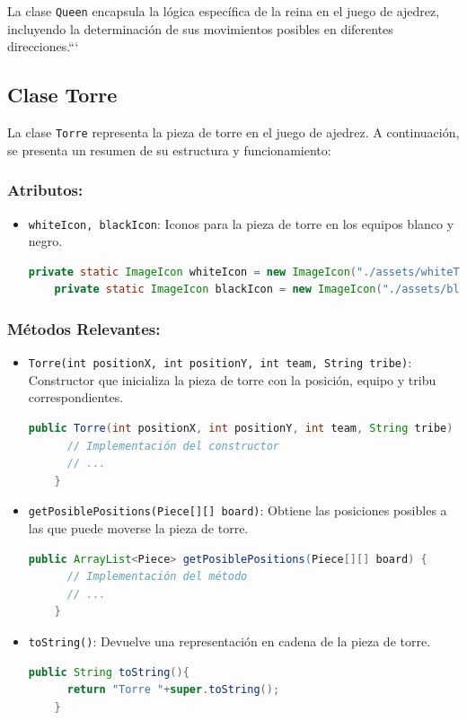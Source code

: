 \documentclass{article}
\begin{document}
La clase \texttt{Queen} encapsula la lógica específica de la reina en el juego de ajedrez, incluyendo la determinación de sus movimientos posibles en diferentes direcciones.```


\subsection{Clase Torre}
La clase \texttt{Torre} representa la pieza de torre en el juego de ajedrez. A continuación, se presenta un resumen de su estructura y funcionamiento:

\subsubsection{Atributos:}
\begin{itemize}
  \item \texttt{whiteIcon, blackIcon}: Iconos para la pieza de torre en los equipos blanco y negro.
  \begin{lstlisting}[language=java,caption={Atributos \texttt{whiteIcon} y \texttt{blackIcon} en la clase \texttt{Torre}}]
    private static ImageIcon whiteIcon = new ImageIcon("./assets/whiteTorre.png");
    private static ImageIcon blackIcon = new ImageIcon("./assets/blackTorre.png");
  \end{lstlisting}
\end{itemize}

\subsubsection{Métodos Relevantes:}
\begin{itemize}
  \item \texttt{Torre(int positionX, int positionY, int team, String tribe)}: Constructor que inicializa la pieza de torre con la posición, equipo y tribu correspondientes.
  \begin{lstlisting}[language=java,caption={Constructor \texttt{Torre} en la clase \texttt{Torre}}]
    public Torre(int positionX, int positionY, int team, String tribe) {
      // Implementación del constructor
      // ...
    }
  \end{lstlisting}

  \item \texttt{getPosiblePositions(Piece[][] board)}: Obtiene las posiciones posibles a las que puede moverse la pieza de torre.
  \begin{lstlisting}[language=java,caption={Método \texttt{getPosiblePositions} en la clase \texttt{Torre}}]
    public ArrayList<Piece> getPosiblePositions(Piece[][] board) {
      // Implementación del método
      // ...
    }
  \end{lstlisting}

  \item \texttt{toString()}: Devuelve una representación en cadena de la pieza de torre.
  \begin{lstlisting}[language=java,caption={Método \texttt{toString} en la clase \texttt{Torre}}]
    public String toString(){
      return "Torre "+super.toString();
    }
  \end{lstlisting}
\end{itemize}
\end{document}
